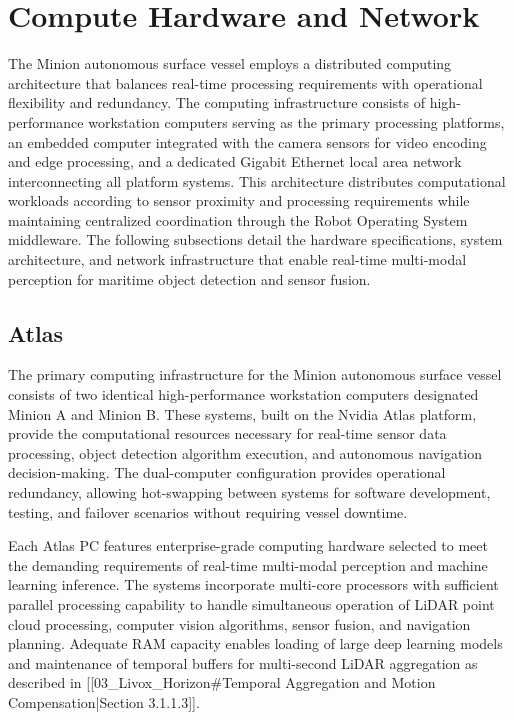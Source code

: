 \documentclass{erauthesis}
\begin{document}
\section{Compute Hardware and Network}

The Minion autonomous surface vessel employs a distributed computing architecture that balances real-time processing requirements with operational flexibility and redundancy. The computing infrastructure consists of high-performance workstation computers serving as the primary processing platforms, an embedded computer integrated with the camera sensors for video encoding and edge processing, and a dedicated Gigabit Ethernet local area network interconnecting all platform systems. This architecture distributes computational workloads according to sensor proximity and processing requirements while maintaining centralized coordination through the Robot Operating System middleware. The following subsections detail the hardware specifications, system architecture, and network infrastructure that enable real-time multi-modal perception for maritime object detection and sensor fusion.

\subsection{Atlas} \label{comp:atlas}

The primary computing infrastructure for the Minion autonomous surface vessel consists of two identical high-performance workstation computers designated Minion A and Minion B. These systems, built on the Nvidia Atlas platform, provide the computational resources necessary for real-time sensor data processing, object detection algorithm execution, and autonomous navigation decision-making. The dual-computer configuration provides operational redundancy, allowing hot-swapping between systems for software development, testing, and failover scenarios without requiring vessel downtime.

Each Atlas PC features enterprise-grade computing hardware selected to meet the demanding requirements of real-time multi-modal perception and machine learning inference. The systems incorporate multi-core processors with sufficient parallel processing capability to handle simultaneous operation of LiDAR point cloud processing, computer vision algorithms, sensor fusion, and navigation planning. Adequate RAM capacity enables loading of large deep learning models and maintenance of temporal buffers for multi-second LiDAR aggregation as described in [[03_Livox_Horizon#Temporal Aggregation and Motion Compensation|Section 3.1.1.3]].
\end{document}
